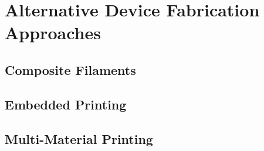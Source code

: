 \section{Alternative Device Fabrication Approaches\label{sec:literatureReview:alternativeDevices}}

\subsection{Composite Filaments\label{sec:literatureReview:alternativeDevices:compositeFilaments}}

\subsection{Embedded Printing\label{sec:literatureReview:alternativeDevices:embeddedPrinting}}

\subsection{Multi-Material Printing\label{sec:literaturereview:alternativeDevices:multiMaterialPrinting}}
